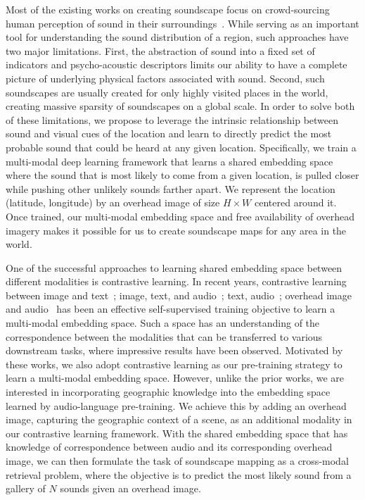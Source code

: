 \documentclass{bmvc2k}
\begin{document}
Most of the existing works on creating soundscape focus on crowd-sourcing human perception of sound in their surroundings~\cite{aiello2016chatty,lionello2020systematic,picaut2019open,aramaki2023image,yue2023visualized}. While serving as an important tool for understanding the sound distribution of a region, such approaches have two major limitations. First, the abstraction of sound into a fixed set of indicators and psycho-acoustic descriptors limits our ability to have a complete picture of underlying physical factors associated with sound. Second, such soundscapes are usually created for only highly visited places in the world, creating massive sparsity of soundscapes on a global scale. In order to solve both of these limitations, we propose to leverage the intrinsic relationship between sound and visual cues of the location and learn to directly predict the most probable sound that could be heard at any given location. Specifically, we train a multi-modal deep learning framework that learns a shared embedding space where the sound that is most likely to come from a given location, is pulled closer while pushing other unlikely sounds farther apart. We represent the location (latitude, longitude) by an overhead image of size $H \times W$ centered around it. Once trained, our multi-modal embedding space and free availability of overhead imagery makes it possible for us to create soundscape maps for any area in the world.

One of the successful approaches to learning shared embedding space between different modalities is contrastive learning. In recent years, contrastive learning between image and text~\cite{radford2021learning}; image, text, and audio~\cite{guzhov2022audioclip}; text, audio~\cite{elizalde2023clap,deshmukh2022audio,laionclap2023}; overhead image and audio~\cite{heidler2023self} has been an effective self-supervised training objective to learn a multi-modal embedding space. Such a space has an understanding of the correspondence between the modalities that can be transferred to various downstream tasks, where impressive results have been observed. Motivated by these works, we also adopt contrastive learning as our pre-training strategy to learn a multi-modal embedding space. However, unlike the prior works, we are interested in incorporating geographic knowledge into the embedding space learned by audio-language pre-training. We achieve this by adding an overhead image, capturing the geographic context of a scene, as an additional modality in our contrastive learning framework. With the shared embedding space that has knowledge of correspondence between audio and its corresponding overhead image, we can then formulate the task of soundscape mapping as a cross-modal retrieval problem, where the objective is to predict the most likely sound from a gallery of $N$ sounds given an overhead image.
\end{document}
